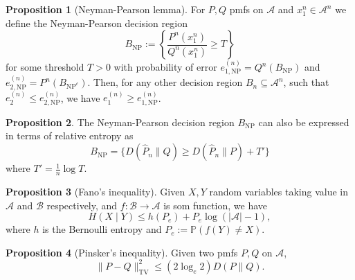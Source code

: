 \documentclass[]{article}
\theoremstyle{definition}
\newtheorem*{proposition}{Proposition}
\begin{document}
\begin{proposition}[Neyman-Pearson lemma]
  For \(P, Q\) pmfs on \(\mathscr{A}\) and \(x_1^n \in \mathscr{A}^n\) we define the Neyman-Pearson 
  decision region
  \[B_{\text{NP}} := \left\{\frac{P^n(x_1^n)}{Q^n(x_1^n)} \ge T\right\}\]
  for some threshold \(T > 0\) with probability of error \(e_{1, \text{NP}}^{(n)} = Q^n(B_{\text{NP}})\)
  and \(e_{2, \text{NP}}^{(n)} = P^n(B_{\text{NP}^c})\). Then, for any other decision region \(B_n \subseteq \mathscr{A}^n\),
  such that \(e_2^{(n)} \le e_{2, \text{NP}}^{(n)}\), we have \(e_1^{(n)} \ge e_{1, \text{NP}}^{(n)}\).
\end{proposition}

\begin{proposition}
  The Neyman-Pearson decision region \(B_{\text{NP}}\) can also be expressed in terms of relative entropy as 
  \[B_{\text{NP}} = \{D(\hat{P}_n \| Q) \ge D(\hat{P}_n \| P) + T'\}\]
  where \(T' = \frac{1}{n} \log T\).
\end{proposition}

\begin{proposition}[Fano's inequality]
  Given \(X, Y\) random variables taking value in \(\mathscr{A}\) and \(\mathscr{B}\) respectively, and 
  \(f : \mathscr{B} \to \mathscr{A}\) is som function, we have
  \[H(X \mid Y) \le h(P_e) + P_e\log (|\mathscr{A}| - 1),\]
  where \(h\) is the Bernoulli entropy and \(P_e := \mathbb{P}(f(Y) \neq X)\).
\end{proposition}

\begin{proposition}[Pinsker's inequality]
  Given two pmfs \(P, Q\) on \(\mathscr{A}\), 
  \[\|P- Q\|_{\text{TV}}^2 \le (2\log_e 2) D(P \| Q).\] 
\end{proposition}
\end{document}
